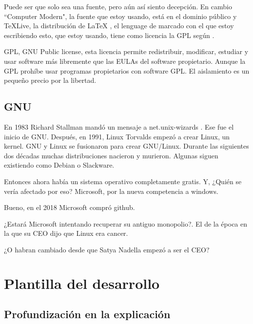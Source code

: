 \documentclass[12pt, twoside]{article}
\begin{document}
Puede ser que solo sea una fuente, pero aún así siento decepción.
En cambio ``Computer Modern", la fuente que estoy usando, está en el dominio público y \TeX Live, la distribución de \LaTeX
, el lenguage de marcado con el que estoy escribiendo esto, que estoy usando, tiene como licencia la GPL según \citet{TEXLIVE}.

GPL, GNU Public license, esta licencia permite redistribuir, modificar, estudiar y usar software más libremente que las EULAs del software propietario.
Aunque la GPL prohíbe usar programas propietarios con software GPL.
El aislamiento es un pequeño precio por la libertad.

%
\subsection{GNU}%
\label{sub:GNU}

En 1983 Richard Stallman mandó un mensaje a net.unix-wizards \citet[89]{faif}.
Ese fue el inicio de GNU.
Después, en 1991, Linux Torvalds empezó a crear Linux, un kernel.
GNU y Linux se fusionaron para crear GNU/Linux.
Durante las siguientes dos décadas muchas distribuciones nacieron y murieron.
Algunas siguen existiendo como Debian o Slackware. \citet{DISTROS}

Entonces ahora había un sistema operativo completamente gratis.
Y, ¿Quién se vería afectado por eso?
Microsoft, por la nueva competencia a windows. \citet{HALLO1}

Bueno, en el 2018 Microsoft compró github. \citet{GITHUB}

¿Estará Microsoft intentando recuperar su antiguo monopolio?.
El de la época en la que su CEO dijo que Linux era cancer. \citet{CANCER}

¿O habran cambiado desde que Satya Nadella empezó a ser el CEO?
\iffalse
\section{Plantilla del desarrollo}%

\subsection{Profundización en la explicación}%
\end{document}
